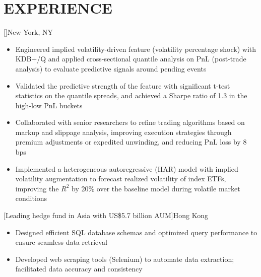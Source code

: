 \documentclass[cmu]{resume}
\begin{document}

    \section{EXPERIENCE}
    []{New York, NY}
    \begin{itemize}
        \item Engineered implied volatility-driven feature (volatility percentage shock) with KDB+/Q and applied cross-sectional quantile analysis on PnL (post-trade analysis) to evaluate predictive signals around pending events
        \item Validated the predictive strength of the feature with significant t-test statistics on the quantile spreads, and achieved a Sharpe ratio of 1.3 in the high-low PnL buckets
        \item Collaborated with senior researchers to refine trading algorithms based on markup and slippage analysis, improving execution strategies through premium adjustments or expedited unwinding, and reducing PnL loss by 8 bps
        \item Implemented a heterogeneous autoregressive (HAR) model with implied volatility augmentation to forecast realized volatility of index ETFs, improving the $R^2$ by 20\% over the baseline model during volatile market conditions
    \end{itemize}
    
    [Leading hedge fund in Asia with US\$5.7 billion AUM]{Hong Kong}
    \begin{itemize}
        \item Designed efficient SQL database schemas and optimized query performance to ensure seamless data retrieval
        \item Developed web scraping tools (Selenium) to automate data extraction; facilitated data accuracy and consistency
    \end{itemize}
\end{document}
